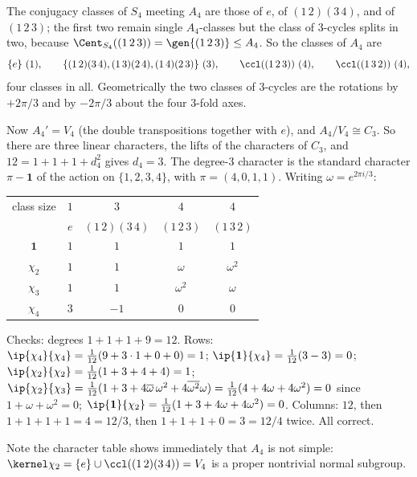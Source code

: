 The conjugacy classes of $S_4$ meeting $A_4$ are those of $e$, of $(1\,2)(3\,4)$, and of $(1\,2\,3)$; the first two remain single $A_4$-classes but the class of $3$-cycles splits in two, because $\Cent_{S_4}((1\,2\,3)) = \gen{(1\,2\,3)} \leq A_4$. So the classes of $A_4$ are
$$\{e\}\ (1),\qquad \{(1\,2)(3\,4),(1\,3)(2\,4),(1\,4)(2\,3)\}\ (3),\qquad \ccl((1\,2\,3))\ (4),\qquad \ccl((1\,3\,2))\ (4),$$
four classes in all. Geometrically the two classes of $3$-cycles are the rotations by $+2\pi/3$ and by $-2\pi/3$ about the four $3$-fold axes.

Now $A_4' = V_4$ (the double transpositions together with $e$), and $A_4/V_4\cong C_3$. So there are three linear characters, the lifts of the characters of $C_3$, and $12 = 1+1+1+d_4^2$ gives $d_4 = 3$. The degree-$3$ character is the standard character $\pi - \mathbf 1$ of the action on $\{1,2,3,4\}$, with $\pi = (4,0,1,1)$. Writing $\omega = e^{2\pi i/3}$:

\begin{center}
\renewcommand{\arraystretch}{1.3}
\setlength{\tabcolsep}{12pt}
\begin{tabular}{c|cccc}
\toprule
class size & $1$ & $3$ & $4$ & $4$\\
 & $e$ & $(1\,2)(3\,4)$ & $(1\,2\,3)$ & $(1\,3\,2)$\\
\midrule
$\mathbf 1$ & $1$ & $1$ & $1$ & $1$\\
$\chi_2$ & $1$ & $1$ & $\omega$ & $\omega^2$\\
$\chi_3$ & $1$ & $1$ & $\omega^2$ & $\omega$\\
$\chi_4$ & $3$ & $-1$ & $0$ & $0$\\
\bottomrule
\end{tabular}
\end{center}

Checks: degrees $1+1+1+9 = 12$. Rows: $\ip{\chi_4}{\chi_4} = \frac1{12}(9 + 3\cdot1 + 0 + 0) = 1$; $\ip{\mathbf1}{\chi_4} = \frac1{12}(3 - 3) = 0$; $\ip{\chi_2}{\chi_2} = \frac1{12}(1 + 3 + 4 + 4) = 1$; $\ip{\chi_2}{\chi_3} = \frac1{12}(1 + 3 + 4\overline\omega\,\omega^2 + 4\overline{\omega^2}\omega) = \frac1{12}(4 + 4\omega + 4\omega^2) = 0$ since $1 + \omega+\omega^2 = 0$; $\ip{\mathbf 1}{\chi_2} = \frac1{12}(1+3+4\omega+4\omega^2) = 0$. Columns: $12$, then $1+1+1+1 = 4 = 12/3$, then $1+1+1+0 = 3 = 12/4$ twice. All correct.

Note the character table shows immediately that $A_4$ is not simple: $\kernel\chi_2 = \{e\}\cup\ccl((1\,2)(3\,4)) = V_4$ is a proper nontrivial normal subgroup.

